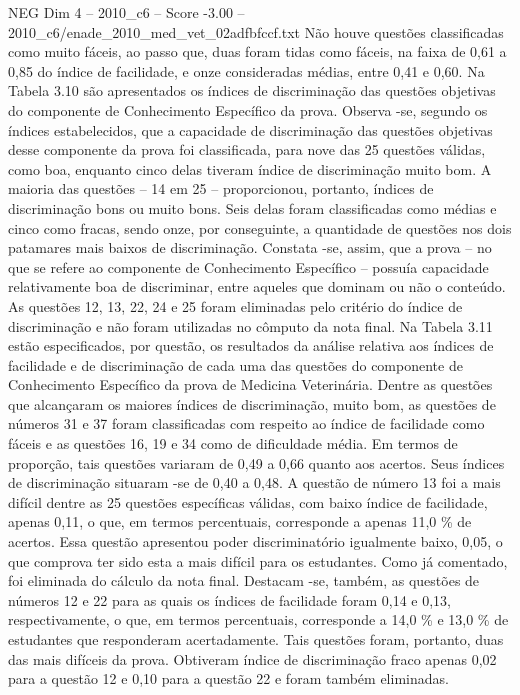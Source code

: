 \begin{textsample}{NEG Dim 4 – 2010\_c6 – Score -3.00 – 2010\_c6/enade\_2010\_med\_vet\_02adfbfccf.txt}
Não houve questões classificadas como muito fáceis, ao passo que, duas foram tidas como fáceis, na faixa de 0,61 a 0,85 do índice de facilidade, e onze consideradas médias, entre 0,41 e 0,60.
Na Tabela 3.10 são apresentados os índices de discriminação das questões objetivas do componente de Conhecimento Específico da prova.
Observa -se, segundo os índices estabelecidos, que a capacidade de discriminação das questões objetivas desse componente da prova foi classificada, para nove das 25 questões válidas, como boa, enquanto cinco delas tiveram índice de discriminação muito bom.
A maioria das questões – 14 em 25 – proporcionou, portanto, índices de discriminação bons ou muito bons.
Seis delas foram classificadas como médias e cinco como fracas, sendo onze, por conseguinte, a quantidade de questões nos dois patamares mais baixos de discriminação.
Constata -se, assim, que a prova – no que se refere ao componente de Conhecimento Específico – possuía capacidade relativamente boa de discriminar, entre aqueles que dominam ou não o conteúdo.
As questões 12, 13, 22, 24 e 25 foram eliminadas pelo critério do índice de discriminação e não foram utilizadas no cômputo da nota final.
Na Tabela 3.11 estão especificados, por questão, os resultados da análise relativa aos índices de facilidade e de discriminação de cada uma das questões do componente de Conhecimento Específico da prova de Medicina Veterinária.
Dentre as questões que alcançaram os maiores índices de discriminação, muito bom, as questões de números 31 e 37 foram classificadas com respeito ao índice de facilidade como fáceis e as questões 16, 19 e 34 como de dificuldade média.
Em termos de proporção, tais questões variaram de 0,49 a 0,66 quanto aos acertos.
Seus índices de discriminação situaram -se de 0,40 a 0,48.
A questão de número 13 foi a mais difícil dentre as 25 questões específicas válidas, com baixo índice de facilidade, apenas 0,11, o que, em termos percentuais, corresponde a apenas 11,0 \% de acertos.
Essa questão apresentou poder discriminatório igualmente baixo, 0,05, o que comprova ter sido esta a mais difícil para os estudantes.
Como já comentado, foi eliminada do cálculo da nota final.
Destacam -se, também, as questões de números 12 e 22 para as quais os índices de facilidade foram 0,14 e 0,13, respectivamente, o que, em termos percentuais, corresponde a 14,0 \% e 13,0 \% de estudantes que responderam acertadamente.
Tais questões foram, portanto, duas das mais difíceis da prova.
Obtiveram índice de discriminação fraco apenas 0,02 para a questão 12 e 0,10 para a questão 22 e foram também eliminadas.

\end{textsample}
